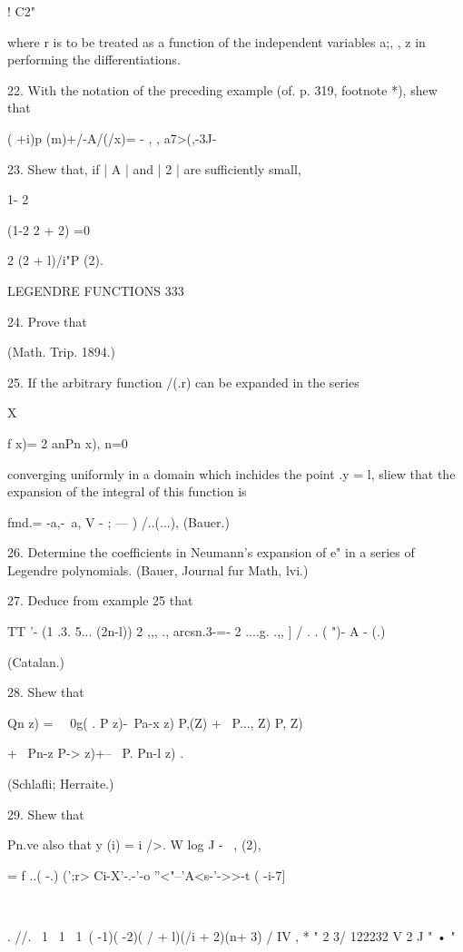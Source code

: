 {{{{  ! C2"



where r is to be treated as a function of the independent variables
a;, , z in performing the differentiations.

22. With the notation of the preceding example (of. p. 319, footnote
*), shew that

( +i)p (m)+/-A/(/x)= - , , a7>(,-3J-

23. Shew that, if | A | and | 2 | are sufficiently small,

1- 2



(1-2 2 + 2) =0



2 (2 + l)/i"P (2).



LEGENDRE FUNCTIONS 333

24. Prove that

(Math. Trip. 1894.)

25. If the arbitrary function /(.r) can be expanded in the series

X

f x)= 2 anPn x), n=0

converging uniformly in a domain which inchides the point .y = l,
sliew that the expansion of the integral of this function is

fmd.= -a,-\ a, V - ; --- ) /..(...), (Bauer.)

26. Determine the coefficients in Neumann's expansion of e" in a
series of Legendre polynomials. (Bauer, Journal fur Math, lvi.)

27. Deduce from example 25 that

TT '- (1 .3. 5... (2n-l)) 2 ,,, ., arcsn.3-=- 2 ....g. .,, ] / . . (
")- A - (.)

(Catalan.)

28. Shew that

Qn z) = \ \ 0g( . P z)-\ Pa-x z) P,(Z) + \ P..., Z) P, Z)

+ \ Pn-z P-> z)+-- \ P. Pn-l z) .

(Schlafli; Herraite.)

29. Shew that

Pn.ve also that y (i) = i />. W log J - \ , (2),

= f ..( -.) (';r> Ci-X'-.-'-o ''<"--'A<s-'->>-t ( -i-7]



\



. //. \ 1 \ 1 \ 1\ ( -1)( -2)( / + l)(/i + 2)(n+ 3) / IV , * " 2 3/
122232 V 2 J " • "



}}}}
